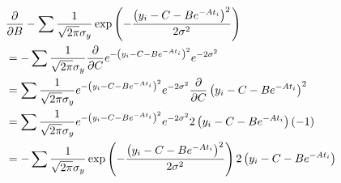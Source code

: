 \begin{align*}
    &\frac{\partial}{\partial B}-\sum \frac{1}{\sqrt{2\pi}\sigma_y}\exp\left(-\frac{\left(y_i - C - B e^{-At_i}\right)^2}{2\sigma^2}\right) \\
    &=-\sum \frac{1}{\sqrt{2\pi}\sigma_y}\frac{\partial}{\partial C}e^{-\left(y_i - C - B e^{-At_i}\right)^2}e^{-2\sigma^2} \\
    &=\sum \frac{1}{\sqrt{2\pi}\sigma_y}e^{-\left(y_i - C - B e^{-At_i}\right)^2}e^{-2\sigma^2}\frac{\partial}{\partial C}\left(y_i - C - B e^{-At_i}\right)^2 \\
    &=\sum \frac{1}{\sqrt{2\pi}\sigma_y}e^{-\left(y_i - C - B e^{-At_i}\right)^2}e^{-2\sigma^2}2\left(y_i - C - B e^{-At_i}\right)(-1) \\
    &=-\sum \frac{1}{\sqrt{2\pi}\sigma_y}\exp\left(-\frac{\left(y_i - C - B e^{-At_i}\right)^2}{2\sigma^2}\right)2\left(y_i - C - B e^{-At_i}\right) \\
\end{align*}




